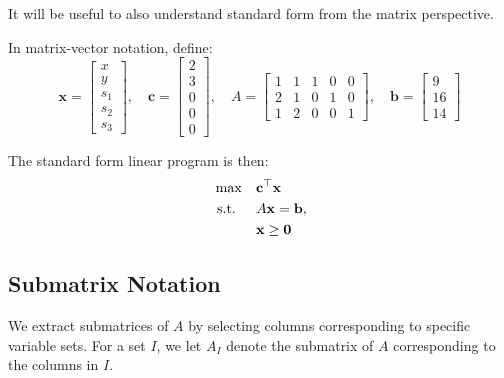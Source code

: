 It will be useful to also understand standard form from the matrix perspective.

\begin{tcolorbox}[colback=gray!5!white, colframe=gray!75!black,    
    width=0.8\textwidth, %
    box align=center, 
    title=\textbf{Matrix-Vector Standard Form}]
\noindent In matrix-vector notation, define:
\[
\mathbf{x} = 
\begin{bmatrix}
x \\
y \\
s_1 \\
s_2 \\
s_3
\end{bmatrix},
\quad
\mathbf{c} =
\begin{bmatrix}
2 \\
3 \\
0 \\
0 \\
0
\end{bmatrix},
\quad
A =
\begin{bmatrix}
1 & 1 & 1 & 0 & 0 \\
2 & 1 & 0 & 1 & 0 \\
1 & 2 & 0 & 0 & 1
\end{bmatrix},
\quad
\mathbf{b} =
\begin{bmatrix}
9 \\
16 \\
14
\end{bmatrix}
\]

\bigskip

\noindent The standard form linear program is then:
\[
\begin{aligned}
\max \quad & \mathbf{c}^\top \mathbf{x} \\
\mbox{ s.t. } \quad & A\mathbf{x} = \mathbf{b}, \\
& \mathbf{x} \geq \mathbf{0}
\end{aligned}
\]

\end{tcolorbox}

\subsection*{Submatrix Notation}
We extract submatrices of \( A \) by selecting columns corresponding to specific variable sets.  
For a set \( I \), we let \( A_I \) denote the submatrix of \( A \) corresponding to the columns in \( I \).

\bigskip

